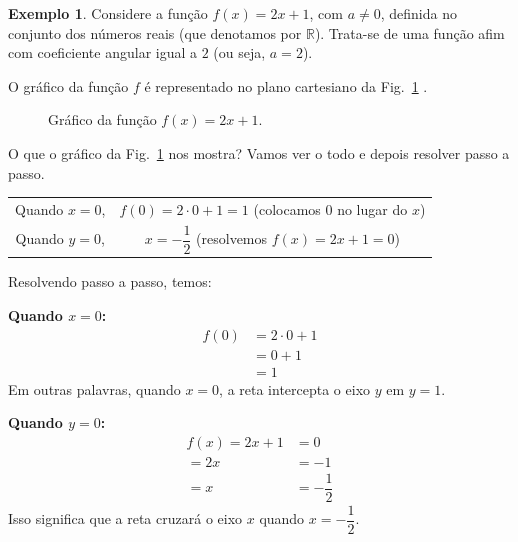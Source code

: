 \documentclass[12pt,openright,twoside,a4paper]{article}
\theoremstyle{definition}
\newtheorem{example}{Exemplo}[section]
\begin{document}
	\begin{example}\label{Ex:funcao_afim_1} Considere a função $f(x) = 2x + 1$, com $a \neq 0$, definida no conjunto dos números reais (que denotamos por $\mathbb{R}$).
		Trata-se de uma função afim com coeficiente angular igual a $2$ (ou seja, $a = 2$).
		
		O gráfico da função $f$ é representado no plano cartesiano da Fig.~\ref{fig:funcao_afim}
		.
		\begin{figure}[h]
			\centering
			\caption{Gráfico da função $f(x) = 2x + 1$.}
			\label{fig:funcao_afim}
		\end{figure}
	\end{example}
	
	O que o gráfico da Fig.~\ref{fig:funcao_afim} nos mostra? Vamos ver o todo e depois resolver passo a passo.
	
	\begin{tabular}{cc}
		Quando $x=0$,  & $f(0) = 2 \cdot 0 + 1 = 1$ (colocamos $0$ no lugar do $x$)\\
		Quando $y = 0$, & $x = -\displaystyle\dfrac{1}{2}$ (resolvemos $f(x) = 2x + 1 = 0$)
	\end{tabular}
	
	Resolvendo passo a passo, temos:
	
	\textbf{Quando $x=0$:}
	\begin{align*}
		f(0) &= 2 \cdot 0 + 1\\
		&= 0 + 1\\
		&= 1
	\end{align*}
	Em outras palavras, quando $x=0$, a reta intercepta o eixo $y$ em $y=1$.
	
	\textbf{Quando $y=0$:}
	\begin{align*}
		f(x) = 2x + 1 &= 0\\
		= 2x &= -1\\
		= x &= -\dfrac{1}{2}
	\end{align*}
	Isso significa que a reta cruzará o eixo $x$ quando $x= \displaystyle -\dfrac{1}{2}$.
	
\end{document}
